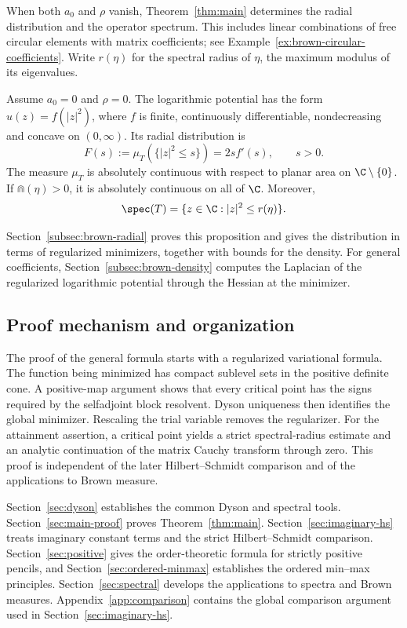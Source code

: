 When both $a_0$ and $\rho$ vanish, Theorem~\ref{thm:main} determines the radial distribution and the operator spectrum.
This includes linear combinations of free circular elements with matrix coefficients; see Example~\ref{ex:brown-circular-coefficients}.
Write $r(\eta)$ for the spectral radius of $\eta$, the maximum modulus of its eigenvalues.

\begin{proposition}\label{prop:brown-radial}
Assume $a_0=0$ and $\rho=0$.
The logarithmic potential has the form $u(z)=f(|z|^2)$, where $f$ is finite, continuously differentiable, nondecreasing and concave on $(0,\infty)$.
Its radial distribution is
\begin{equation}\label{eq:brown-radial-cdf}
 F(s):=\mu_T(\{|z|^2\le s\})=2sf'(s),\qquad s>0.
\end{equation}
The measure $\mu_T$ is absolutely continuous with respect to planar area on $\C\setminus\{0\}$.
If $\Cap(\eta)>0$, it is absolutely continuous on all of $\C$.
Moreover,
\begin{equation}\label{eq:brown-spectral-disk}
 \spec(T)=\{z\in\C:|z|^2\le r(\eta)\}.
\end{equation}
\end{proposition}
Section~\ref{subsec:brown-radial} proves this proposition and gives the distribution in terms of regularized minimizers, together with bounds for the density.
For general coefficients, Section~\ref{subsec:brown-density} computes the Laplacian of the regularized logarithmic potential through the Hessian at the minimizer.

\subsection{Proof mechanism and organization}
The proof of the general formula starts with a regularized variational formula.
The function being minimized has compact sublevel sets in the positive definite cone.
A positive-map argument shows that every critical point has the signs required by the selfadjoint block resolvent.
Dyson uniqueness then identifies the global minimizer.
Rescaling the trial variable removes the regularizer.
For the attainment assertion, a critical point yields a strict spectral-radius estimate and an analytic continuation of the matrix Cauchy transform through zero.
This proof is independent of the later Hilbert--Schmidt comparison and of the applications to Brown measure.

Section~\ref{sec:dyson} establishes the common Dyson and spectral tools.
Section~\ref{sec:main-proof} proves Theorem~\ref{thm:main}.
Section~\ref{sec:imaginary-hs} treats imaginary constant terms and the strict Hilbert--Schmidt comparison.
Section~\ref{sec:positive} gives the order-theoretic formula for strictly positive pencils, and Section~\ref{sec:ordered-minmax} establishes the ordered min--max principles.
Section~\ref{sec:spectral} develops the applications to spectra and Brown measures.
Appendix~\ref{app:comparison} contains the global comparison argument used in Section~\ref{sec:imaginary-hs}.
